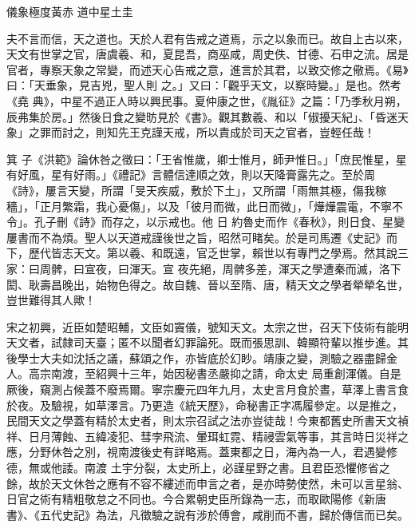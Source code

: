 
\begin{pinyinscope}

 儀象極度黃赤
 道中星土圭



 夫不言而信，天之道也。天於人君有告戒之道焉，示之以象而已。故自上古以來，天文有世掌之官，唐虞羲、和，夏昆吾，商巫咸，周史佚、甘德、石申之流。居是官者，專察天象之常變，而述天心告戒之意，進言於其君，以致交修之儆焉。《易》曰：「天垂象，見吉兇，聖人則
 之。」又曰：「觀乎天文，以察時變。」是也。然考《堯
 典》，中星不過正人時以興民事。夏仲康之世，《胤征》之篇：「乃季秋月朔，辰弗集於房。」然後日食之變昉見於《書》。觀其數羲、和以「俶擾天紀」、「昏迷天象」之罪而討之，則知先王克謹天戒，所以責成於司天之官者，豈輕任哉！



 箕
 子《洪範》論休咎之徵曰：「王省惟歲，卿士惟月，師尹惟日。」「庶民惟星，星有好風，星有好雨。」《禮記》言體信達順之效，則以天降膏露先之。至於周《詩》，屢言天變，所謂「旻天疾威，敷於下土」，又所謂「雨無其極，傷我稼穡」，「正月繁霜，我心憂傷」，以及「彼月而微，此日而微」，「燁燁震電，不寧不令」。孔子刪《詩》而存之，以示戒也。他
 日
 約魯史而作《春秋》，則日食、星變屢書而不為煩。聖人以天道戒謹後世之旨，昭然可睹矣。於是司馬遷《史記》而下，歷代皆志天文。第以羲、和既遠，官乏世掌，賴世以有專門之學焉。然其說三家：曰周髀，曰宣夜，曰渾天。宣
 夜先絕，周髀多差，渾天之學遭秦而滅，洛下閎、耿壽昌晚出，始物色得之。故自魏、晉以至隋、唐，精天文之學者犖犖名世，豈世難得其人歟！



 宋之初興，近臣如楚昭輔，文臣如竇儀，號知天文。太宗之世，召天下伎術有能明天文者，試隸司天臺；匿不以聞者幻罪論死。既而張思訓、韓顯符輩以推步進。其後學士大夫如沈括之議，蘇頌之作，亦皆底於幻眇。靖康之變，測驗之器盡歸金人。高宗南渡，至紹興十三年，始因秘書丞嚴抑之請，命太史
 局重創渾儀。自是厥後，窺測占候蓋不廢焉爾。寧宗慶元四年九月，太史言月食於晝，草澤上書言食於夜。及驗視，如草澤言。乃更造《統天歷》，命秘書正字馮履參定。以是推之，民間天文之學蓋有精於太史者，則太宗召試之法亦豈徒哉！今東都舊史所書天文禎祥、日月薄蝕、五緯凌犯、彗孛飛流、暈珥虹霓、精祲雲氣等事，其言時日災祥之應，分野休咎之別，視南渡後史有詳略焉。蓋東都之日，海內為一人，君遇變修德，無或他諉。南渡
 土宇分裂，太史所上，必謹星野之書。且君臣恐懼修省之餘，故於天文休咎之應有不容不縷述而申言之者，是亦時勢使然，未可以言星翁、日官之術有精粗敬怠之不同也。今合累朝史臣所錄為一志，而取歐陽修《新唐書》、《五代史記》為法，凡徵驗之說有涉於傅會，咸削而不書，歸於傳信而已矣。




\end{pinyinscope}
